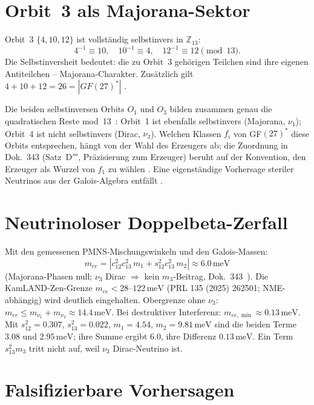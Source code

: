 \section{Orbit~3 als Majorana-Sektor \BM}

Orbit~3 $\{4,10,12\}$ ist vollständig selbstinvers in
$\mathbb{Z}_{13}$:
\[
4^{-1}\equiv10,\quad 10^{-1}\equiv4,\quad 12^{-1}\equiv12\pmod{13}.
\]
Die Selbstinversheit bedeutet: die zu Orbit~3 gehörigen
Teilchen sind ihre eigenen Antiteilchen -- Majorana-Charakter.
Zusätzlich gilt $4+10+12=26=|GF(27)^*|$ \BM.

Die beiden selbstinversen Orbits $O_1$ und $O_3$ bilden zusammen genau die
quadratischen Reste mod~13 \BM\,\LM: Orbit~1 ist ebenfalls selbstinvers
(Majorana, $\nu_1$); Orbit~4 ist nicht selbstinvers (Dirac, $\nu_3$). Welchen
Klassen $f_i$ von GF$(27)^*$ diese Orbits entsprechen, hängt von der Wahl des
Erzeugers ab; die Zuordnung in Dok.~343 (Satz~D$'''$, Präzisierung zum
Erzeuger) beruht auf der Konvention, den Erzeuger als Wurzel von $f_1$ zu
wählen \SetzM. Eine eigenständige Vorhersage steriler Neutrinos aus der
Galois-Algebra entfällt \BM.

\section{Neutrinoloser Doppelbeta-Zerfall \KM}

Mit den gemessenen PMNS-Mischungswinkeln und den Galois-Massen:
\[
m_{ee}=\left|c_{12}^2c_{13}^2\,m_1+s_{12}^2c_{13}^2\,m_2\right|
\approx6.0\,\text{meV}
\]
(Majorana-Phasen null; $\nu_3$ Dirac $\Rightarrow$ kein $m_3$-Beitrag, Dok.~343~\BM).
Die KamLAND-Zen-Grenze $m_{ee}<28$--$122\,\text{meV}$ (PRL 135 (2025) 262501; NME-abhängig) wird deutlich
eingehalten. Obergrenze ohne $\nu_3$: $m_{ee}\leq m_{\nu_1}+m_{\nu_2}\approx14.4\,\text{meV}$.
Bei destruktiver Interferenz: $m_{ee,\min}\approx0.13\,\text{meV}$.
Mit $s_{12}^2=0.307$, $s_{13}^2=0.022$, $m_1=4.54$, $m_2=9.81\,\text{meV}$ sind
die beiden Terme $3.08$ und $2.95\,\text{meV}$; ihre Summe ergibt $6.0$, ihre
Differenz $0.13\,\text{meV}$. Ein Term $s_{13}^2m_3$ tritt nicht auf, weil
$\nu_3$ Dirac-Neutrino ist.

\section{Falsifizierbare Vorhersagen}

